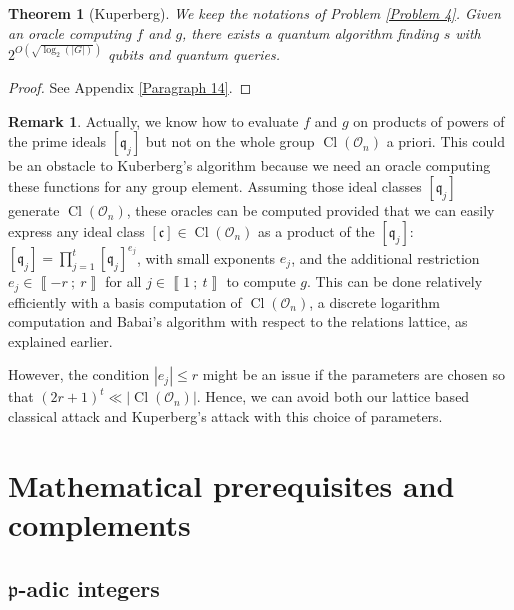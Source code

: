 \documentclass[a4paper,10pt,notitlepage]{report}
\theoremstyle{definition}
\theoremstyle{plain}
\newtheorem{Theorem}[Definition]{Theorem}
\theoremstyle{definition}
\newtheorem{Remark}[Definition]{Remark}
\newcommand{\mO}{\mathcal{O}}
\renewcommand{\i}[2]{\left\llbracket #1~;~#2\right\rrbracket}
\renewcommand{\(}{\left(}
\renewcommand{\)}{\right)}
\newcommand{\mf}[1]{\mathfrak{#1}}
\DeclareMathOperator{\Cl}{Cl}
\begin{document}
\begin{Theorem}[Kuperberg]
We keep the notations of Problem \ref{Problem 4}. Given an oracle computing $f$ and $g$, there exists a quantum algorithm finding $s$ with $2^{O(\sqrt{\log_2(|G|)})}$ qubits and quantum queries.
\end{Theorem}

\begin{proof}
See Appendix \ref{Paragraph 14}.
\end{proof}

\begin{Remark}
Actually, we know how to evaluate $f$ and $g$ on products of powers of the prime ideals $[\mf{q}_j]$ but not on the whole group $\Cl(\mO_n)$ a priori. This could be an obstacle to Kuberberg's algorithm because we need an oracle computing these functions for any group element. Assuming those ideal classes $[\mf{q}_j]$ generate $\Cl(\mO_n)$, these oracles can be computed provided that we can easily express any ideal class $[\mf{c}]\in \Cl(\mO_n)$ as a product of the $[\mf{q}_j]$: $[\mf{q}_j]=\prod_{j=1}^t[\mf{q}_j]^{e_j}$, with small exponents $e_j$, and the additional restriction $e_j\in\i{-r}{r}$ for all $j\in\i{1}{t}$ to compute $g$. This can be done relatively efficiently with a basis computation of $\Cl(\mO_n)$, a discrete logarithm computation and Babai's algorithm with respect to the relations lattice, as explained earlier.  

However, the condition $|e_j|\leq r$ might be an issue if the parameters are chosen so that $(2r+1)^t\ll |\Cl(\mO_n)|$. Hence, we can avoid both our lattice based classical attack and Kuperberg's attack with this choice of parameters.
\end{Remark}






\appendix

\chapter{Mathematical prerequisites and complements}

\section{$\mf{p}$-adic integers}
\end{document}
